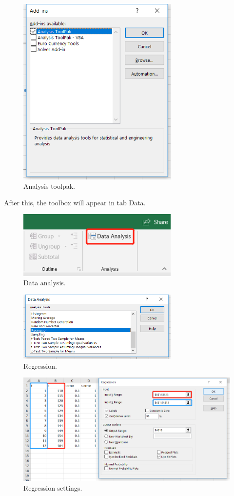 \documentclass[12pt]{article}
\begin{document}
\begin{figure}[H]
\centering
\includegraphics[width=8cm]{e6.png}
\caption{Analysis toolpak.}
\end{figure}

After this, the toolbox will appear in tab \textsf{Data}.

\begin{figure}[H]
\centering
\includegraphics[width=8cm]{e12.png}
\caption{Data analysis.}
\end{figure}

\begin{figure}[H]
\centering
\includegraphics[width=8cm]{e7.png}
\caption{Regression.}
\end{figure}

\begin{figure}[H]
\centering
\includegraphics[width=16cm]{e8.png}
\caption{Regression settings.}
\end{figure}
\end{document}
